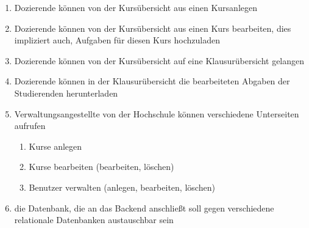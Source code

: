 \begin{enumerate}
	\item \gls{Dozierende} können von der Kursübersicht aus einen \gls{Kurs}anlegen
	\item \gls{Dozierende} können von der Kursübersicht aus einen \gls{Kurs} bearbeiten, dies impliziert auch, \gls{Aufgabe}n für diesen \gls{Kurs} hochzuladen
	\item \gls{Dozierende} können von der Kursübersicht auf eine Klausurübersicht gelangen
	\item \gls{Dozierende} können in der Klausurübersicht die bearbeiteten Abgaben der \gls{Studierende}n herunterladen
	\item \gls{Verwaltungsangestellte} von der Hochschule können verschiedene Unterseiten aufrufen
	\begin{enumerate}
		\item \gls{Kurs}e anlegen
		\item \gls{Kurs}e bearbeiten (bearbeiten, löschen)
		\item Benutzer verwalten (anlegen, bearbeiten, löschen)
	\end{enumerate}	 
	\item die Datenbank, die an das Backend anschließt soll gegen verschiedene \gls{relationale Datenbank}en austauschbar sein
\end{enumerate}